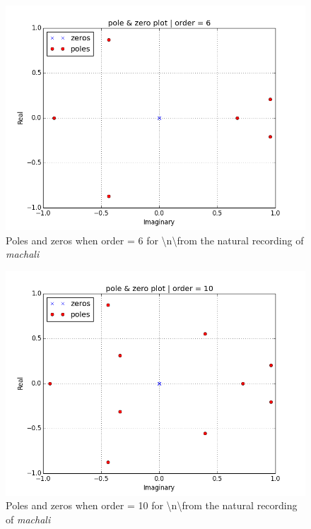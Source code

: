 \documentclass[a4paper]{article}
\begin{document}
\begin{figure}[h!]
    \includegraphics[width=\linewidth]{./images/n_pole-zero_6_.png}
    \caption{Poles and zeros when order = 6 for \textbackslash n\textbackslash from the natural recording of \textit{machali}}
    \label{fig:1}
\end{figure}


\begin{figure}[h!]
    \includegraphics[width=\linewidth]{./images/n_pole-zero_10_.png}
    \caption{Poles and zeros when order = 10 for \textbackslash n\textbackslash from the natural recording of \textit{machali}}
    \label{fig:1}
\end{figure}
\end{document}
